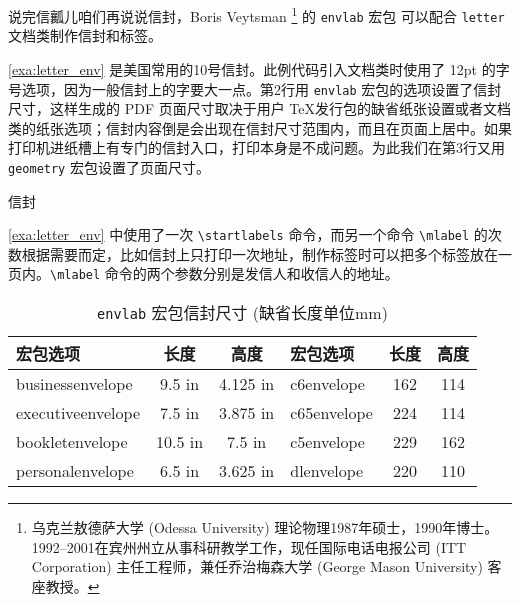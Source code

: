 说完信瓤儿咱们再说说信封，Boris Veytsman\indexVeytsman{} \footnote{乌克兰敖德萨大学 (Odessa University) 理论物理1987年硕士，1990年博士。1992--2001在宾州州立从事科研教学工作，现任国际电话电报公司 (ITT Corporation) 主任工程师，兼任乔治梅森大学 (George Mason University) 客座教授。} 的 \texttt{envlab} 宏包 \citep{Veytsman_envlab} 可以配合 \texttt{letter} 文档类制作信封和标签。

\autoref{exa:letter_env} 是美国常用的10号信封。此例代码引入文档类时使用了 12pt 的字号选项，因为一般信封上的字要大一点。第2行用 \texttt{envlab} 宏包的选项设置了信封尺寸，这样生成的 PDF 页面尺寸取决于用户 \TeX 发行包的缺省纸张设置或者文档类的纸张选项；信封内容倒是会出现在信封尺寸范围内，而且在页面上居中。如果打印机进纸槽上有专门的信封入口，打印本身是不成问题。为此我们在第3行又用 \texttt{geometry} 宏包设置了页面尺寸。

\begin{example}[htbp]
\caption{信封}
\label{exa:letter_env}
\end{example}

\autoref{exa:letter_env} 中使用了一次 \verb|\startlabels| 命令，而另一个命令 \verb|\mlabel| 的次数根据需要而定，比如信封上只打印一次地址，制作标签时可以把多个标签放在一页内。\verb|\mlabel| 命令的两个参数分别是发信人和收信人的地址。

\begin{table}[htbp]
\centering
\caption{\texttt{envlab} 宏包信封尺寸 (缺省长度单位mm)}
\label{tab:env_sizes}
\begin{tabular}{lcclcc}
  \toprule
  宏包选项           & 长度    & 高度     & 宏包选项     & 长度   & 高度\\
  \midrule
  businessenvelope  & 9.5 in  & 4.125 in & c6envelope  & 162 & 114\\
  executiveenvelope & 7.5 in  & 3.875 in & c65envelope & 224 & 114\\
  bookletenvelope   & 10.5 in & 7.5 in   & c5envelope  & 229 & 162\\
  personalenvelope  & 6.5 in  & 3.625 in & dlenvelope  & 220 & 110\\ 
  \bottomrule
\end{tabular}
\end{table}

